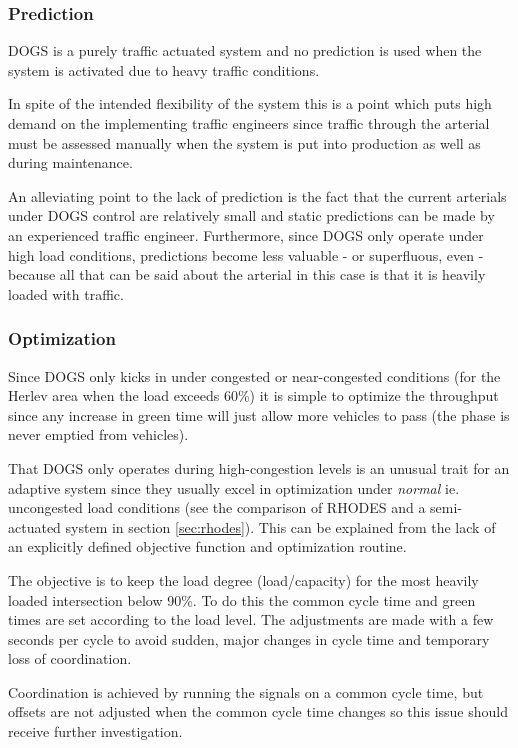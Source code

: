 \subsubsection*{Prediction}

DOGS is a purely traffic actuated system and no prediction is used
when the system is activated due to heavy traffic conditions.

In spite of the intended flexibility of the system this is a point
which puts high demand on the implementing traffic engineers since
traffic through the arterial must be assessed manually when the system
is put into production as well as during maintenance.

An alleviating point to the lack of prediction is the fact that the
current arterials under DOGS control are relatively small and static
predictions can be made by an experienced traffic
engineer. Furthermore, since DOGS only operate under high load
conditions, predictions become less valuable - or superfluous, even -
because all that can be said about the arterial in this case is that
it is heavily loaded with traffic.

\subsubsection*{Optimization}

Since DOGS only kicks in under congested or near-congested conditions
(for the Herlev area when the load exceeds 60\%) it is simple to
optimize the throughput since any increase in green time will just
allow more vehicles to pass (the phase is never emptied from
vehicles).

That DOGS only operates during high-congestion levels is an unusual trait for an adaptive system since they usually excel in optimization under \textit{normal} ie. uncongested load conditions (see the comparison of RHODES and a semi-actuated system in section \ref{sec:rhodes}). This can be explained from the lack of an explicitly defined objective function and optimization routine.

The objective is to keep the load degree (load/capacity) for the most heavily loaded intersection below 90\%.
To do this the common cycle time and green times are set according to the load level. The adjustments are made with a few seconds per cycle to avoid sudden, major changes in cycle time and temporary loss of coordination.

Coordination is achieved by running the signals on a common cycle time, but offsets are not adjusted when the common cycle time changes so this issue should receive further investigation.

